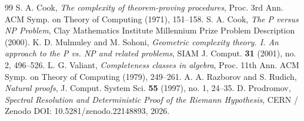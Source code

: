 \documentclass[11pt,reqno]{amsart}
\theoremstyle{plain}
\theoremstyle{definition}
\theoremstyle{remark}
\numberwithin{equation}{section}
\begin{document}
\begin{thebibliography}{99}
 S. A. Cook, \emph{The complexity of theorem-proving procedures}, Proc. 3rd Ann. ACM Symp. on Theory of Computing (1971), 151--158.
 S. A. Cook, \emph{The P versus NP Problem}, Clay Mathematics Institute Millennium Prize Problem Description (2000).
 K. D. Mulmuley and M. Sohoni, \emph{Geometric complexity theory. I. An approach to the P vs. NP and related problems}, SIAM J. Comput. \textbf{31} (2001), no. 2, 496--526.
 L. G. Valiant, \emph{Completeness classes in algebra}, Proc. 11th Ann. ACM Symp. on Theory of Computing (1979), 249--261.
 A. A. Razborov and S. Rudich, \emph{Natural proofs}, J. Comput. System Sci. \textbf{55} (1997), no. 1, 24--35.
 D. Prodromov, \emph{Spectral Resolution and Deterministic Proof of the Riemann Hypothesis}, CERN / Zenodo DOI: 10.5281/zenodo.22148893, 2026.
\end{thebibliography}
\end{document}
